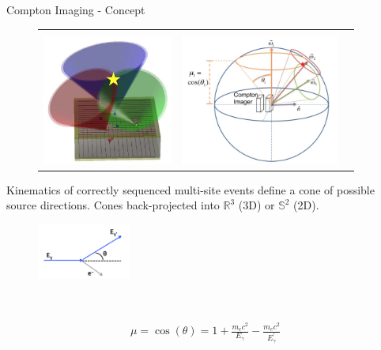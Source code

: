 \documentclass[xcolor=x11names,compress]{beamer}
\renewcommand{\(}{\begin{columns}}
\renewcommand{\)}{\end{columns}}
\newcommand{\<}[1]{\begin{column}{#1}}
\renewcommand{\>}{\end{column}}
\begin{document}
\begin{frame}{Compton Imaging - Concept}

\vspace{-10pt}

\begin{figure}
\begin{tabular}{ccc}
&& \cite{Haefner} \\[-3ex]
\includegraphics[height=1.7in]{Figures/Compton.png} & 
\includegraphics[height=1.7in]{Figures/Compton2.png} & 
\end{tabular}
\end{figure}

Kinematics of correctly sequenced multi-site events define a cone of possible source directions. Cones back-projected into $\mathbb{R}^3$ (3D) or $\mathbb{S}^2$ (2D).

\vspace{-20pt}

\begin{figure}
\includegraphics[width=1.2in]{Figures/ComptonKinematic.png} 
\end{figure}

\hfill\textcolor{white}{a}

\begin{align*}
\mu = \cos(\theta) = 1 + \frac{m_e c^2}{E_\gamma} - \frac{m_e c^2}{E_\gamma^\prime}
\end{align*}

\end{frame}
\end{document}
